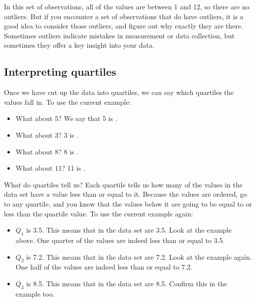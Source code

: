 \documentclass[../../../main.tex]{subfiles}
\begin{document}
\noindent
In this set of observations, all of the values are between 1 and 12, so there are no outliers. But if you encounter a set of observations that do have outliers, it is a good idea to consider those outliers, and figure out why exactly they are there. Sometimes outliers indicate mistakes in measurement or data collection, but sometimes they offer a key insight into your data.


\subsection{Interpreting quartiles}

Once we have cut up the data into quartiles, we can say which quartiles the values fall in. To use the current example:

\begin{itemize}
  \item What about 5? We say that 5 is .
  \item What about 3? 3 is .
  \item What about 8? 8 is .
  \item What about 11? 11 is .
\end{itemize}

\noindent
What do quartiles tell us? Each quartile tells us how many of the values in the data set have a value less than or equal to it. Because the values are ordered, go to any quartile, and you know that the values below it are going to be equal to or less than the quartile value. To use the current example again:

\begin{itemize}
  \item $Q_{1}$ is 3.5. This means that  in the data set are  3.5. Look at the example above. One quarter of the values are indeed less than or equal to 3.5.
  \item $Q_{2}$ is 7.2. This means that  in the data set are  7.2. Look at the example again. One half of the values are indeed less than or equal to 7.2.
  \item $Q_{3}$ is 8.5. This means that  in the data set are  8.5. Confirm this in the example too.
\end{itemize}
\end{document}
